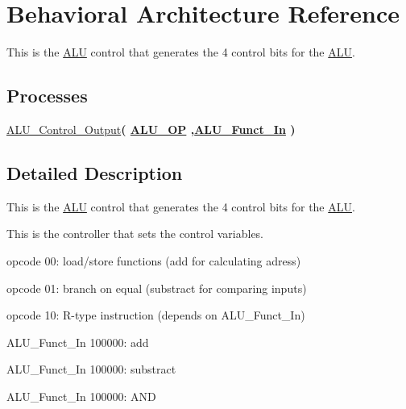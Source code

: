 \hypertarget{class_a_l_u___control_1_1_behavioral}{\section{\-Behavioral \-Architecture \-Reference}
\label{class_a_l_u___control_1_1_behavioral}
}


\-This is the \hyperlink{class_a_l_u}{\-A\-L\-U} control that generates the 4 control bits for the \hyperlink{class_a_l_u}{\-A\-L\-U}.  


\*
\*
\subsection*{\-Processes}
 \begin{DoxyCompactItemize}
\item 
\hypertarget{class_a_l_u___control_1_1_behavioral_a86f70441267014ffedcb802b679dd560}{\hyperlink{class_a_l_u___control_1_1_behavioral_a86f70441267014ffedcb802b679dd560}{\-A\-L\-U\-\_\-\-Control\-\_\-\-Output}{\bfseries  ( {\bfseries {\bfseries \hyperlink{class_a_l_u___control_ab5e38318e201e0011dc9fe806b2c9ea4}{\-A\-L\-U\-\_\-\-O\-P}}   ,{\bfseries \hyperlink{class_a_l_u___control_aa057cc5bea77eab736c8c526429fa204}{\-A\-L\-U\-\_\-\-Funct\-\_\-\-In}}  } )}}\label{class_a_l_u___control_1_1_behavioral_a86f70441267014ffedcb802b679dd560}

\end{DoxyCompactItemize}


\subsection{\-Detailed \-Description}
\-This is the \hyperlink{class_a_l_u}{\-A\-L\-U} control that generates the 4 control bits for the \hyperlink{class_a_l_u}{\-A\-L\-U}. 

\-This is the controller that sets the control variables.

opcode 00\-: load/store functions (add for calculating adress)

opcode 01\-: branch on equal (substract for comparing inputs)

opcode 10\-: \-R-\/type instruction (depends on \-A\-L\-U\-\_\-\-Funct\-\_\-\-In)

\-A\-L\-U\-\_\-\-Funct\-\_\-\-In 100000\-: add

\-A\-L\-U\-\_\-\-Funct\-\_\-\-In 100000\-: substract

\-A\-L\-U\-\_\-\-Funct\-\_\-\-In 100000\-: \-A\-N\-D

